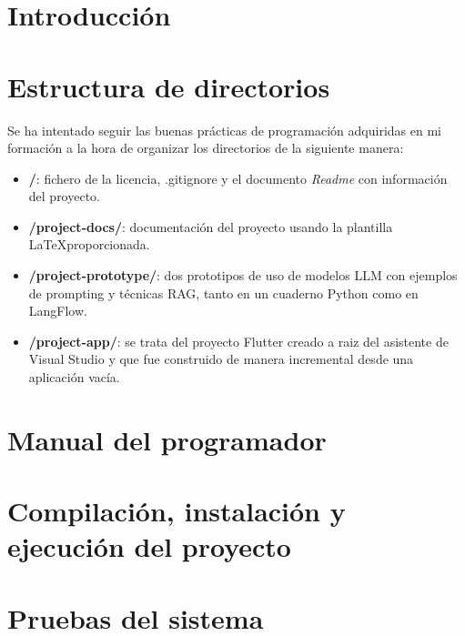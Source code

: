 
\section{Introducción}

\section{Estructura de directorios}
Se ha intentado seguir las buenas prácticas de programación adquiridas en mi formación a la hora de organizar los directorios de la siguiente manera:
\begin{itemize}
	
	\item \textbf{/}: fichero de la licencia, .gitignore y el documento \textit{Readme} con información del proyecto.
	
	\item \textbf{/project-docs/}: documentación del proyecto usando la plantilla \LaTeX  proporcionada.
	
	\item \textbf{/project-prototype/}: dos prototipos de uso de modelos LLM con ejemplos de prompting y técnicas RAG, tanto en un cuaderno Python como en LangFlow.
	
	\item \textbf{/project-app/}: se trata del proyecto Flutter creado a raiz del asistente de Visual Studio y que fue construido de manera incremental desde una aplicación vacía.
	
	
\end{itemize}

\section{Manual del programador}

\section{Compilación, instalación y ejecución del proyecto}

\section{Pruebas del sistema}
